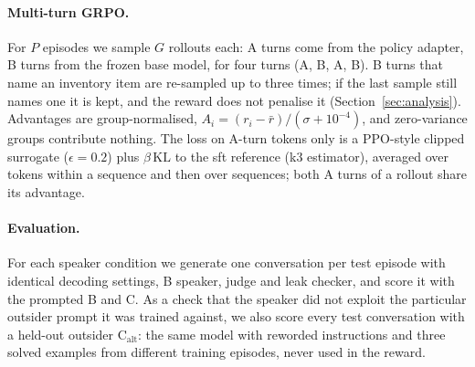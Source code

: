 \paragraph{Multi-turn GRPO.} For $P$ episodes we sample $G$ rollouts each: A turns come from the policy adapter, B turns from the frozen base model, for four turns (A, B, A, B). B turns that name an inventory item are re-sampled up to three times; if the last sample still names one it is kept, and the reward does not penalise it (Section~\ref{sec:analysis}).
Advantages are group-normalised, $A_i=(r_i-\bar r)/(\sigma+10^{-4})$, and zero-variance groups contribute nothing. The loss on A-turn tokens only is a PPO-style clipped surrogate ($\epsilon=0.2$) plus $\beta\,\mathrm{KL}$ to the sft reference (k3 estimator), averaged over tokens within a sequence and then over sequences; both A turns of a rollout share its advantage.
\paragraph{Evaluation.} For each speaker condition we generate one conversation per test episode with identical decoding settings, B speaker, judge and leak checker, and score it with the prompted B and C. As a check that the speaker did not exploit the particular outsider prompt it was trained against, we also score every test conversation with a held-out outsider C$_\text{alt}$: the same model with reworded instructions and three solved examples from different training episodes, never used in the reward.
